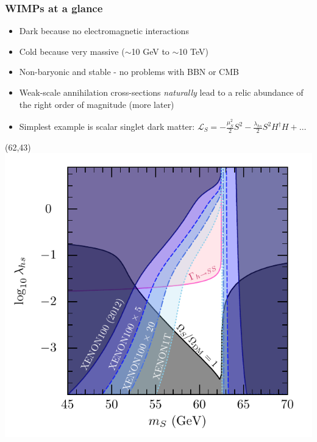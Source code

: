 \documentclass[xcolor=dvipsnames]{beamer}
\begin{document}
\begin{frame}

\end{frame}


\begin{frame}
  \frametitle{WIMPs at a glance}
  
  \begin{itemize}
    \item
    Dark because no electromagnetic interactions
    \item
    Cold because very massive ($\sim$10 GeV to $\sim$10 TeV)
    \item
    Non-baryonic and stable - no problems with BBN or CMB
    \item
    Weak-scale annihilation cross-sections \emph{naturally} lead to a relic abundance of the right order of magnitude (more later)
    \item
    Simplest example is scalar singlet dark matter: $\mathcal{L}_S = -\frac{\mu_S^2}{2}S^2 - \frac{\lambda_{hs}}{2}S^2H^\dagger H + \ldots$ 
  \end{itemize}

  \vspace{4cm}

  \begin{textblock}{47}(62,43)
  \includegraphics[width=\linewidth]{Fig6a}
  \end{textblock}


\end{frame}
\end{document}
